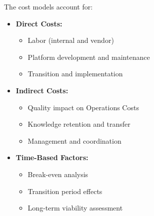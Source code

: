 \documentclass[12pt,a4paper]{article}
\newenvironment{explanation}
{\begin{mdframed}[style=explanationstyle,frametitle={Explanation}]}
{\end{mdframed}}
\begin{document}
\begin{explanation}
The cost models account for:
\begin{itemize}
    \item \textbf{Direct Costs:}
        \begin{itemize}
            \item Labor (internal and vendor)
            \item Platform development and maintenance
            \item Transition and implementation
        \end{itemize}
    \item \textbf{Indirect Costs:}
        \begin{itemize}
            \item Quality impact on Operations Costs
            \item Knowledge retention and transfer
            \item Management and coordination
        \end{itemize}
    \item \textbf{Time-Based Factors:}
        \begin{itemize}
            \item Break-even analysis
            \item Transition period effects
            \item Long-term viability assessment
        \end{itemize}
\end{itemize}
\end{explanation}
\end{document}
